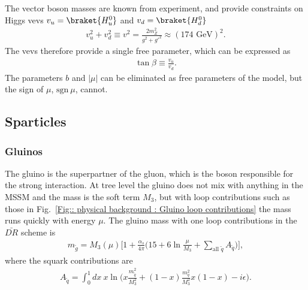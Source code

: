 \documentclass[twoside,english]{uiofysmaster}
\begin{document}
{The vector boson masses are known from experiment, and provide constraints on Higgs vevs $v_u = \braket{H_u^0}$ and $v_d = \braket{H_d^0}$
\begin{align}
v_u^2 + v_d^2 \equiv v^2 = \frac{2m_Z^2}{g^2 + {g'}^2} \approx (174 \text{ GeV})^2.
\end{align} 
The vevs therefore provide a single free parameter, which can be expressed as
\begin{align}
\tan \beta \equiv \frac{v_u}{v_d}.
\end{align}
The parameters $b$ and $|\mu|$ can be eliminated as free parameters of the model, but the sign of $\mu$, $\text{sgn} ~\mu$, cannot.

\subsection{Sparticles}

\subsubsection{Gluinos}

The gluino is the superpartner of the gluon, which is the boson responsible for the strong interaction. At tree level the gluino does not mix with anything in the MSSM and the mass is the soft term $M_3$, but with loop contributions such as those in Fig.~\ref{Fig:: physical background : Gluino loop contributions} the mass runs quickly with energy $\mu$. The gluino mass with one loop contributions in the $\bar{DR}$ scheme is
\begin{align}
m_{\widetilde{g}} = M_3 (\mu) \Bigg[ 1 + \frac{\alpha_s}{4 \pi} \Bigg( 15 + 6 \ln \frac{\mu}{M_3} + \sum_{\text{all } \widetilde{q}} A_{\widetilde{q}} \Bigg) \Bigg],
\end{align}
where the squark contributions are
\begin{align}
A_{\widetilde{q}} = \int_0^1 dx~ x \ln \big(x \frac{m_{\widetilde{q}}^2}{M_3^2} + (1-x) \frac{m_q^2}{M_3^2} x(1-x) - i \epsilon \big).
\end{align}



\begin{figure}
\end{figure}}
\end{document}

